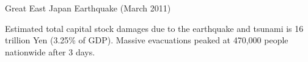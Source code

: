 \documentclass[serif, aspectratio=169]{beamer}
\begin{document}

\begin{frame}{Great East Japan Earthquake (March 2011)}







    \begin{minipage}{1.00\textwidth}
    \raggedright
    \begin{flushleft}
\begin{table}[h!]
\vspace{-0.7cm}
\raggedright
Estimated total capital stock damages due to the earthquake and tsunami is 16 trillion Yen (3.25\% of GDP). Massive evacuations peaked at 470,000 people nationwide after 3 days.


\end{table}
\end{flushleft}
\end{minipage}
\end{frame}
\end{document}
